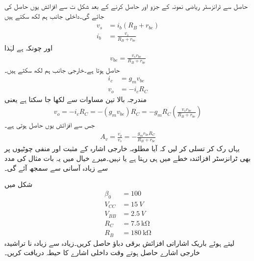 حاصل  سے ٹرانزسٹر ریاضی نمونہ  کے جزو  اور  حاصل کرنے کے بعد شکل  ت سے افزائش  یوں حاصل کی جائے گی۔داخلی جانب ہم لکھ سکتے ہیں
\begin{align*}
v_s&=i_b \left (R_B+r_{be} \right )\\
i_b&=\frac{v_s}{R_B+r_{be}}
\end{align*}
اور چونکہ  ہے لہٰذا
\begin{align*}
v_{be}=\frac{v_s r_{be}}{R_B+r_{be}}
\end{align*}
حاصل ہوتا ہے۔خارجی جانب ہم لکھ سکتے ہیں۔
\begin{align*}
i_c&=g_m v_{be}\\
v_o&=-i_c R_C
\end{align*}
مندرجہ بالا تین  مساوات سے   لکھا جا سکتا ہے یعنی
\begin{align*}
v_o = -i_c R_C = -\left(g_m v_{be} \right )R_C=-g_m R_C \left(\frac{v_s r_{be}}{R_B+r_{be}} \right )
\end{align*}
جس سے افزائش  یوں حاصل ہوتی ہے۔
\begin{align} \label{مساوات_ٹرانزسٹر_ایمپلیفائر_بغیر_مخارج_مزاحمت_کی_افزائش}
A_v = \frac{v_o}{v_s}=-\frac{g_m r_{be} R_C}{R_B+r_{be}}
\end{align}
	یہاں رک کر تسلی کر لیں کہ آیا مطلوبہ خارجی اشارہ   کے مثبت اور منفی چوٹیوں پر بھی ٹرانزسٹر افزائندہ خطے میں ہی رہتا ہے یا نہیں۔میرے خیال میں یہ بات مثال کی مدد سے زیادہ آسانی سے سمجھ آئے گی۔

شکل   میں
\begin{align*}
\beta_0&=\num{100}\\
V_{CC}&=\SI{15}{V}\\
V_{BB}&=\SI{2.5}{V}\\
R_C&=\SI{7.5}{ \kilo \ohm}\\
R_B&=\SI{180}{\kilo \ohm}
\end{align*}
لیتے ہوئے باریک اشاراتی افزائش برقی دباؤ  حاصل کریں۔زیادہ سے زیادہ نا تراشیدہ خارجی اشارے حاصل ہوتے وقت داخلی اشارے کا حیطہ دریافت کریں۔

